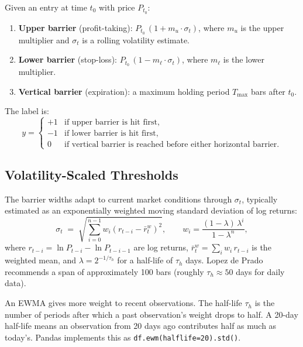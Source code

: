 \begin{definition}
Given an entry at time $t_0$ with price $P_{t_0}$:
\begin{enumerate}[leftmargin=2em]
\item \textbf{Upper barrier} (profit-taking):
$P_{t_0}\,(1 + m_u \cdot \sigma_t)$, where $m_u$ is the upper multiplier
and $\sigma_t$ is a rolling volatility estimate.
\item \textbf{Lower barrier} (stop-loss):
$P_{t_0}\,(1 - m_\ell \cdot \sigma_t)$, where $m_\ell$ is the lower multiplier.
\item \textbf{Vertical barrier} (expiration):
a maximum holding period $T_{\max}$ bars after $t_0$.
\end{enumerate}
The label is:
\[
y =
\begin{cases}
+1 & \text{if upper barrier is hit first,} \\
-1 & \text{if lower barrier is hit first,} \\
0  & \text{if vertical barrier is reached before either horizontal barrier.}
\end{cases}
\]
\end{definition}

\subsection{Volatility-Scaled Thresholds}

The barrier widths adapt to current market conditions through $\sigma_t$,
typically estimated as an exponentially weighted moving standard deviation
of log returns:
\begin{equation}
\label{eq:ewma-vol}
\sigma_t \;=\; \sqrt{\sum_{i=0}^{n-1} w_i \left(r_{t-i} - \bar{r}_t^{w}\right)^2},
\qquad w_i = \frac{(1-\lambda)\,\lambda^{i}}{1-\lambda^{n}},
\end{equation}
where $r_{t-i} = \ln P_{t-i} - \ln P_{t-i-1}$ are log returns,
$\bar{r}_t^{w} = \sum_i w_i\, r_{t-i}$ is the weighted mean,
and $\lambda = 2^{-1/\tau_h}$ for a half-life of $\tau_h$ days.
Lopez de Prado recommends a span of approximately 100 bars
(roughly $\tau_h \approx 50$ days for daily data).

\begin{prereq}
An EWMA gives more weight to recent observations.
The half-life $\tau_h$ is the number of periods after which a past
observation's weight drops to half.
A 20-day half-life means an observation from 20 days ago contributes
half as much as today's.
Pandas implements this as \texttt{df.ewm(halflife=20).std()}.
\end{prereq}

